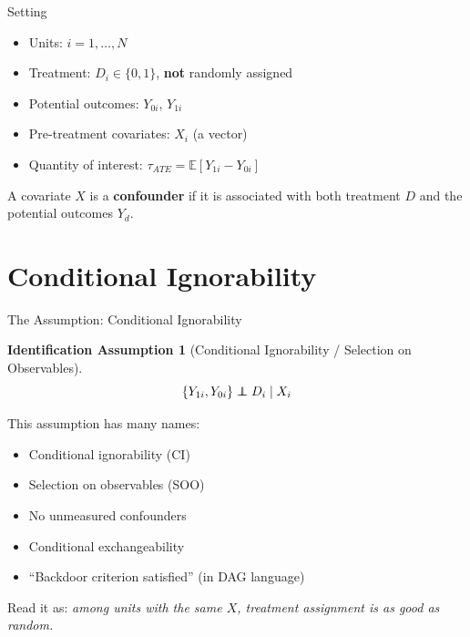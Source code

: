 \documentclass[xcolor=dvipsnames]{beamer}
\newcommand\E{\mathbb{E}}
\newcommand\indep{\protect\mathpalette{\protect\independenT}{\perp}}
\def\independenT#1#2{\mathrel{\rlap{$#1#2$}\mkern2mu{#1#2}}}
\newtheorem{iass}{Identification Assumption}
\begin{document}
\begin{frame}{Setting}
\small
{}
\begin{itemize}
\item Units: $i = 1, \ldots, N$
\item Treatment: $D_i \in \{0,1\}$, \textbf{not} randomly assigned
\item Potential outcomes: $Y_{0i}$, $Y_{1i}$
\item Pre-treatment covariates: $X_i$ (a vector)
\item Quantity of interest: $\tau_{ATE} = \E[Y_{1i} - Y_{0i}]$
\end{itemize}

\bigskip
{} A covariate $X$ is a \textbf{confounder} if it is associated with both treatment $D$ and the potential outcomes $Y_d$.
\end{frame}


\section{Conditional Ignorability}

\begin{frame}{The Assumption: Conditional Ignorability}
\small
{}
\begin{iass}[Conditional Ignorability / Selection on Observables]
$$\{Y_{1i}, Y_{0i}\} \indep D_i \mid X_i$$
\end{iass}

 This assumption has many names:
\begin{itemize}
\footnotesize
\item Conditional ignorability (CI)
\item Selection on observables (SOO)
\item No unmeasured confounders
\item Conditional exchangeability
\item ``Backdoor criterion satisfied'' (in DAG language)
\end{itemize}

\bigskip
{} Read it as: \textit{among units with the same $X$, treatment assignment is as good as random.}
\end{frame}
\end{document}
